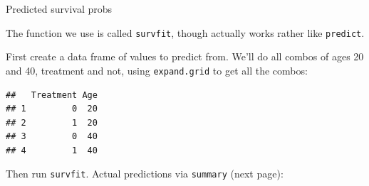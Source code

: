 \begin{frame}[fragile]{Predicted survival probs}

The function we use is called
\texttt{survfit}, though actually works rather like
\texttt{predict}. 

First create a data frame of values to predict from. We'll do all
combos of ages 20 and 40, treatment and not, using
\texttt{expand.grid} to get all the combos:

 
\begin{knitrout}
\color{fgcolor}\begin{kframe}
\begin{alltt}
\hlkwb{=}\hlstd{(}\hlstd{=}\hlstd{(}\hlstd{,}\hlstd{),}\hlstd{=}\hlstd{(}\hlstd{,}\hlstd{))}
\end{alltt}
\begin{verbatim}
##   Treatment Age
## 1         0  20
## 2         1  20
## 3         0  40
## 4         1  40
\end{verbatim}
\end{kframe}
\end{knitrout}


Then run \texttt{survfit}. Actual predictions via \texttt{summary}
(next page):

 
\begin{knitrout}
\color{fgcolor}\begin{kframe}
\begin{alltt}
\hlkwb{=}
\end{alltt}
\end{kframe}
\end{knitrout}


\end{frame}

